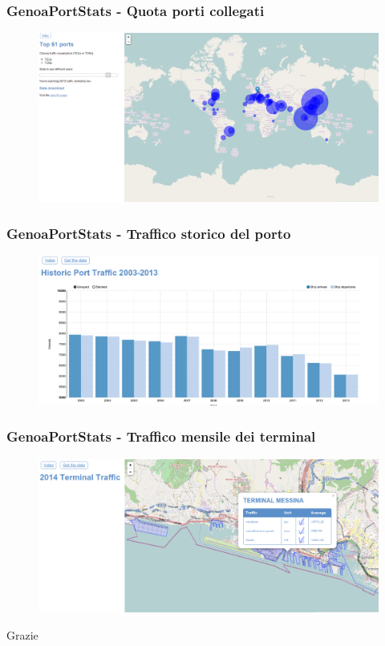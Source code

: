 \documentclass{beamer}
\begin{document}
\begin{frame}
\frametitle{GenoaPortStats - Quota porti collegati} 
\begin{figure}
\includegraphics[width=\textwidth]{../img/genoaportstats_top61_interface2012.png} 
\end{figure}
\end{frame}

\begin{frame}
\frametitle{GenoaPortStats - Traffico storico del porto} 
\begin{figure}
\includegraphics[width=\textwidth]{../img/portstats_historic.png} 
\end{figure}
\end{frame}

\begin{frame}
\frametitle{GenoaPortStats - Traffico mensile dei terminal} 
\begin{figure}
\includegraphics[width=\textwidth]{../img/portstats_terminal.png} 
\end{figure}
\end{frame}

\begin{frame}[plain,c]
\begin{center}
\Huge Grazie
\end{center}
\end{frame}
\end{document}
